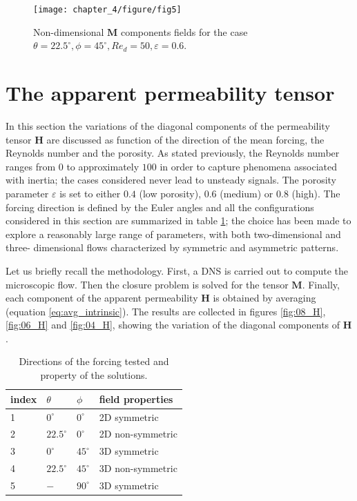 \begin{figure}[H]
	\centering
	\texttt{[image: chapter\_4/figure/fig5]}
	\caption{Non-dimensional $\mathbf{M}$ components fields for the case $\theta=22.5^{\circ}, \phi=45^{\circ}, Re_d=50, \varepsilon=0.6$.}
	\label{fig:5ch4}
\end{figure}    






\section{The apparent permeability tensor}

\label{sec:5}

In this section the variations of the diagonal components of the permeability tensor $\mathbf{H}$ are discussed as function of the direction of 
the mean forcing, the Reynolds number and  the porosity. As stated previously, the Reynolds number ranges from $0$ to approximately $100$ in 
order to capture phenomena associated with inertia; the cases considered never lead to unsteady signals. 
The porosity parameter $\varepsilon$ is set to either $0.4$ (low porosity),  $0.6$ (medium) or
$0.8$ (high). The forcing direction is defined by the Euler angles and all the configurations considered in this section are summarized in 
table \ref{table:directions}; the choice has been made to explore a reasonably large range of parameters, with both two-dimensional and three-
dimensional flows characterized by symmetric and asymmetric patterns.

Let us briefly recall the methodology. First, a DNS is carried out to compute the microscopic flow. Then the  closure problem is solved for the 
tensor $\mathbf{M}$. Finally, each component of the apparent permeability  $\mathbf{H}$  is obtained by averaging (equation 
\eqref{eq:avg_intrinsic}).
The results are collected in figures \ref{fig:08_H}, \ref{fig:06_H} and \ref{fig:04_H}, showing the variation of the diagonal components 
of $\mathbf{H}$. 


\begin{table}[t]
	\centering
	\begin{tabular}{l | l l l}
		index & $\theta$ & $\phi$ & field properties \\\hline	\hline
		1 & $0^\circ$ & $0^\circ$ & 2D symmetric \\
		2 & $22.5^\circ$ & $0^\circ$ & 2D non-symmetric \\
		3 & $0^\circ$ & $45^\circ$ & 3D symmetric \\
		4 & $22.5^\circ$ & $45^\circ$ & 3D non-symmetric \\
		5 & $-$ & $90^\circ$ & 3D symmetric \\
		\hline  
	\end{tabular}
	\caption{Directions of the forcing tested and property of the solutions.}
	\label{table:directions}
\end{table}



